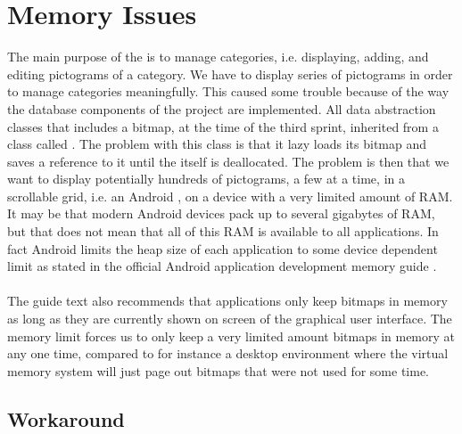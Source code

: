 
\section{Memory Issues}
\label{sec:memory_issues}

The main purpose of the \ct is to manage categories, i.e. displaying, adding, and editing pictograms of a category. We have to display series of pictograms in order to manage categories meaningfully. This caused some trouble because of the way the database components of the project are implemented. All data abstraction classes that includes a bitmap, at the time of the third sprint, inherited from a class called . The problem with this class is that it lazy loads its bitmap and saves a reference to it until the  itself is deallocated. The problem is then that we want to display potentially hundreds of pictograms, a few at a time, in a scrollable grid, i.e. an Android , on a device with a very limited amount of RAM. It may be that modern Android devices pack up to several gigabytes of RAM, but that does not mean that all of this RAM is available to all applications. In fact Android limits the heap size of each application to some device dependent limit as stated in the official Android application development memory guide \parencite{android_memory}.
\\\\
The guide text also recommends that applications only keep bitmaps in memory as long as they are currently shown on screen of the graphical user interface. The memory limit forces us to only keep a very limited amount bitmaps in memory at any one time, compared to for instance a desktop environment where the virtual memory system will just page out bitmaps that were not used for some time.


\subsection{Workaround}
\label{subsec:pictogram_workaround}

